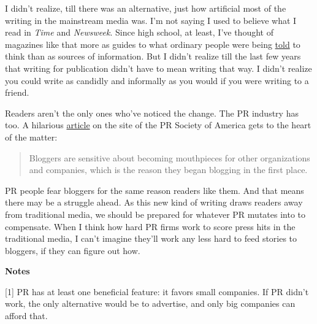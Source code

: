 I didn't
                  realize, till there was an alternative, just how artificial
                  most of the writing in the mainstream media was. I'm not
                  saying I used to believe what I read in \emph{Time} and
                  \emph{Newsweek}. Since high school, at least, I've thought of
                  magazines like that more as guides to what ordinary people
                  were being \href{http://www.paulgraham.com/say.html}{told} to think than as
                  sources of information. But I didn't realize till the last few
                  years that writing for publication didn't have to mean writing
                  that way. I didn't realize you could write as candidly and
                  informally as you would if you were writing to a friend.

Readers
                  aren't the only ones who've noticed the change. The PR
                  industry has too. A hilarious
                  \href{http://www.prsa.org/\_Publications/magazines/0802news1.asp}{article}
                  on the site of the PR Society of America gets to the heart of
                  the matter:
                  \begin{quote}

                    Bloggers are sensitive about becoming mouthpieces for other
                    organizations and companies, which is the reason they began
                    blogging in the first place.
                  
\end{quote}

                  PR people fear bloggers for the same reason readers like them.
                  And that means there may be a struggle ahead. As this new kind
                  of writing draws readers away from traditional media, we
                  should be prepared for whatever PR mutates into to compensate.
                  When I think how hard PR firms work to score press hits in the
                  traditional media, I can't imagine they'll work any less hard
                  to feed stories to bloggers, if they can figure out how.




                  \textbf{Notes}

[1] PR has at least one beneficial feature: it favors small
                  companies. If PR didn't work, the only alternative would be to
                  advertise, and only big companies can afford that.

